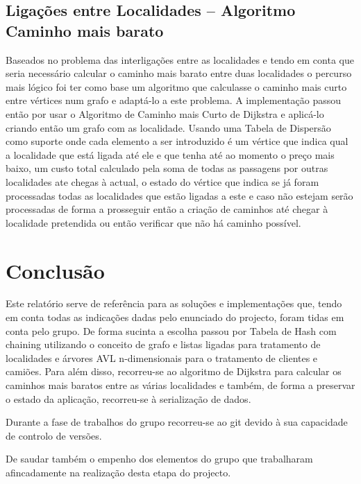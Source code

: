\documentclass[a5paper,twocolumn, 11pt]{article}
\def\hyph{-\penalty0\hskip0pt\relax}
\begin{document}
\subsection[Ligações entre Localidades]{Ligações entre Localidades -- Algoritmo Caminho mais \vbox{barato}}
Baseados no problema das interligações entre as localidades e tendo em conta que seria necessário calcular o caminho mais barato entre duas localidades o percurso mais lógico foi ter como base um algoritmo que calculasse o caminho mais curto entre vértices num grafo e adaptá-lo a este problema. A implementação passou então por usar o Algoritmo de Caminho mais Curto de Dijkstra e aplicá-lo criando então um grafo com as localidade. Usando uma Tabela de Dispersão como suporte onde cada elemento a ser introduzido é um vértice que indica qual a localidade que está ligada até ele e que tenha até ao momento o preço mais baixo, um custo total calculado pela soma de todas as passagens por outras localidades ate chegas à actual, o estado do vértice que indica se já foram processadas todas as localidades que estão ligadas a este e caso não estejam serão processadas de forma a prosseguir então a criação de caminhos até chegar à localidade pretendida ou então verificar que não há caminho possível.



\clearpage
\section{Conclusão}
Este relatório serve de referência para as soluções e implementações que, tendo em conta todas as indicações dadas pelo enunciado do projecto, foram tidas em conta pelo grupo. De forma sucinta a escolha passou por Tabela de Hash com chaining utilizando o conceito de grafo e listas ligadas para tratamento de localidades e árvores AVL n\hyph{}dimensionais para o tratamento de clientes e camiões. Para além disso, recorreu-se ao algoritmo de Dijkstra para calcular os caminhos mais baratos entre as várias localidades e também, de forma a preservar o estado da aplicação, recorreu-se à serialização de dados.

Durante a fase de trabalhos do grupo recorreu-se ao git devido à sua capacidade de controlo de versões.

De saudar também o empenho dos elementos do grupo que trabalharam afincadamente na realização desta etapa do projecto.

\clearpage
\onecolumn
\end{document}
